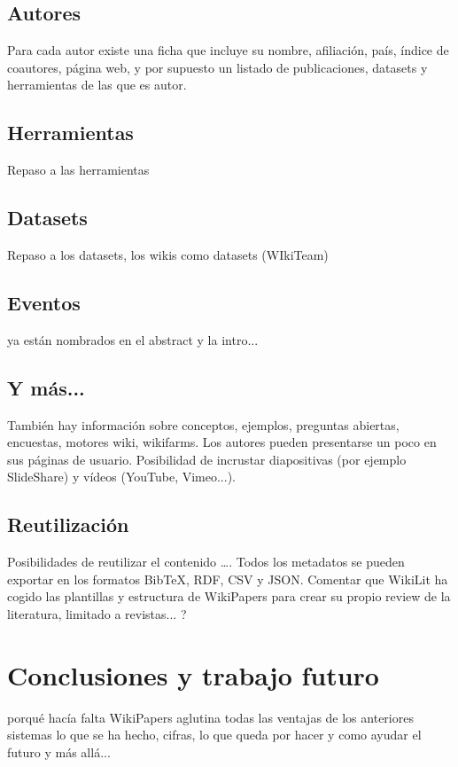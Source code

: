 \documentclass[twoside]{article}
\begin{document}
\begin{multicols}{2}
\subsection{Autores}
Para cada autor existe una ficha que incluye su nombre, afiliaci\'{o}n, pa\'{i}s, \'{i}ndice de coautores, p\'{a}gina web, y por supuesto un listado de publicaciones, datasets y herramientas de las que es autor.

\subsection{Herramientas}
Repaso a las herramientas

\subsection{Datasets}
Repaso a los datasets, los wikis como datasets (WIkiTeam)

\subsection{Eventos}
ya est\'{a}n nombrados en el abstract y la intro...

\subsection{Y m\'{a}s...}
Tambi\'{e}n hay informaci\'{o}n sobre conceptos, ejemplos, preguntas abiertas, encuestas, motores wiki, wikifarms.
Los autores pueden presentarse un poco en sus p\'{a}ginas de usuario.
Posibilidad de incrustar diapositivas (por ejemplo SlideShare) y v\'{i}deos (YouTube, Vimeo...).

\subsection{Reutilizaci\'{o}n}
Posibilidades de reutilizar el contenido ….
Todos los metadatos se pueden exportar en los formatos BibTeX, RDF, CSV y JSON.
Comentar que WikiLit ha cogido las plantillas y estructura de WikiPapers para crear su propio review de la literatura, limitado a revistas... ?

\section{Conclusiones y trabajo futuro}
porqu\'{e} hac\'{i}a falta WikiPapers
aglutina todas las ventajas de los anteriores sistemas
lo que se ha hecho, cifras,
lo que queda por hacer y como ayudar
el futuro y m\'{a}s all\'{a}...


\end{multicols}
\end{document}
